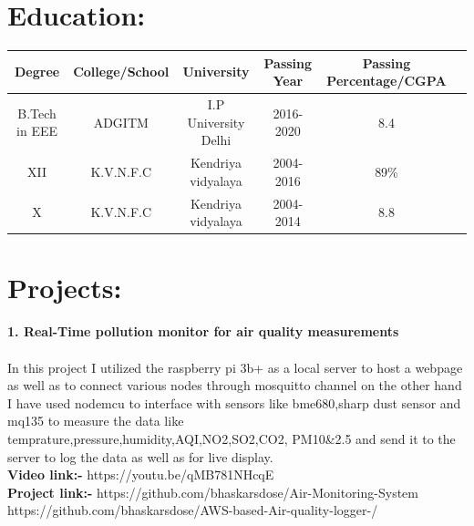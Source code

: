 \documentclass[10pt]{report}
\begin{document}
\section*{Education:} %
\begin{center}
\begin{tabular}{|c|c|c|c|c|c|}
	\hline
	\hspace{2pt}\large\textbf{Degree} \hspace{2pt} & \hspace{2pt}\large\textbf{College/School}\hspace{2pt} &\hspace{2pt} \large\textbf{University}\hspace{2pt} &\hspace{2pt}\large\textbf{Passing Year}\hspace{2pt} & \hspace{2pt}\large\textbf{Passing Percentage/CGPA}\hspace{2pt}\\
	\hline
	 B.Tech in EEE & ADGITM & I.P University Delhi & 2016-2020 & 8.4 \\
	XII & K.V.N.F.C & Kendriya vidyalaya & 2004-2016 & 89\%\\
	X & K.V.N.F.C & Kendriya vidyalaya & 2004-2014 & 8.8\\ 
	\hline
\end{tabular}
\end{center}

\section*{Projects:}%
 
\textbf{\large 1. Real-Time pollution monitor for air quality measurements\\[1pt] }
\\In this project I utilized the raspberry pi 3b+ as a local server to host a webpage as well as to connect various nodes through mosquitto channel on the other hand I have used nodemcu to interface with sensors like bme680,sharp dust sensor and mq135 to measure the data like temprature,pressure,humidity,AQI,NO2,SO2,CO2, PM10\&2.5 and send it to the server to log the data as well as for live display.
\\\textbf{Video link:-} https://youtu.be/qMB781NHcqE
\\\textbf{Project link:-} https://github.com/bhaskarsdose/Air-Monitoring-System \\               https://github.com/bhaskarsdose/AWS-based-Air-quality-logger-/\\[2pt]
	 
\end{document}
